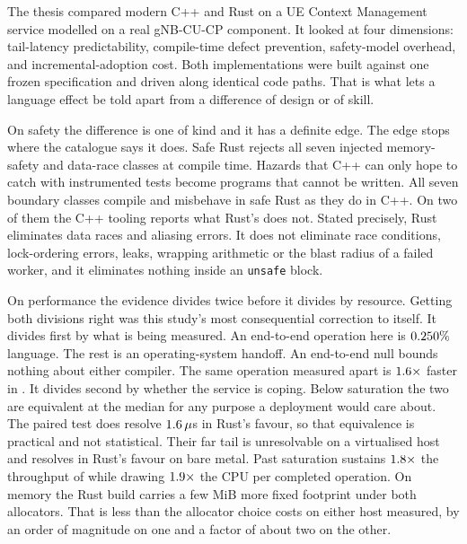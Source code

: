 \documentclass[english,twoside,openright,a4paper,censored,csm,software-track-2020]{HYthesisML}
\begin{document}
The thesis compared modern C++ and Rust on a UE Context Management service modelled on a
real gNB-CU-CP component. It looked at four dimensions: tail-latency predictability,
compile-time defect prevention, safety-model overhead, and incremental-adoption cost.
Both implementations were built against one frozen specification and driven along identical
code paths. That is what lets a language effect be told apart from a difference of design
or of skill.

On safety the difference is one of kind and it has a definite edge. The edge stops where
the catalogue says it does. Safe Rust rejects all seven injected memory-safety and
data-race classes at compile time. Hazards that C++ can only hope to catch with
instrumented tests become programs that cannot be written. All seven boundary classes
compile and misbehave in safe Rust as they do in C++. On two of them the C++ tooling
reports what Rust's does not. Stated precisely, Rust eliminates data races and aliasing
errors. It does not eliminate race conditions, lock-ordering errors, leaks, wrapping
arithmetic or the blast radius of a failed worker, and it eliminates nothing inside an
\texttt{unsafe} block.

On performance the evidence divides twice before it divides by resource. Getting both
divisions right was this study's most consequential correction to itself. It divides first
by what is being measured. An end-to-end operation here is $0.250\%$
language. The rest is an operating-system handoff. An end-to-end null bounds nothing about
either compiler. The same operation measured apart is $1.6\times$ faster in
\BudgetCoreFaster{}. It divides second by whether the service is coping. Below saturation
the two are equivalent at the median for any purpose a deployment would care about. The
paired test does resolve $1.6\,\mu$s in Rust's favour, so that equivalence is
practical and not statistical. Their far tail is unresolvable on a virtualised
host and resolves in Rust's favour on bare metal. Past saturation
\OverloadSustainedFaster{} sustains $1.8\times$ the
throughput of \OverloadSustainedSlower{} while drawing $1.9\times$
the CPU per completed operation. On memory the Rust build carries a few MiB more fixed
footprint under both allocators. That is less than the allocator choice costs on either
host measured, by an order of magnitude on one and a factor of about two on the other.
\end{document}
